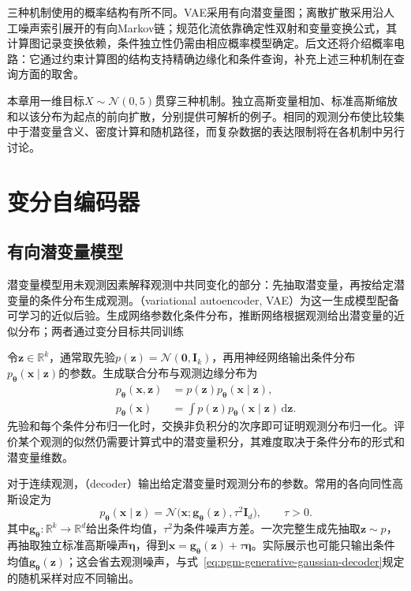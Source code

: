 三种机制使用的概率结构有所不同。VAE采用有向潜变量图；离散扩散采用沿人工噪声索引展开的有向Markov链；规范化流依靠确定性双射和变量变换公式，其计算图记录变换依赖，条件独立性仍需由相应概率模型确定。后文还将介绍概率电路：它通过约束计算图的结构支持精确边缘化和条件查询，补充上述三种机制在查询方面的取舍。

本章用一维目标$X\sim\mathcal{N}(0,5)$贯穿三种机制。独立高斯变量相加、标准高斯缩放和以该分布为起点的前向扩散，分别提供可解析的例子。相同的观测分布使比较集中于潜变量含义、密度计算和随机路径，而复杂数据的表达限制将在各机制中另行讨论。

\section{变分自编码器}
\label{sec:pgm-generative-vae}

\subsection{有向潜变量模型}
\label{sec:pgm-generative-latent-model}

潜变量模型用未观测因素解释观测中共同变化的部分：先抽取潜变量，再按给定潜变量的条件分布生成观测。（variational autoencoder, VAE）为这一生成模型配备可学习的近似后验。生成网络参数化条件分布，推断网络根据观测给出潜变量的近似分布；两者通过变分目标共同训练

令$\bm{z}\in\mathbb{R}^{k}$，通常取先验$p(\bm{z})=\mathcal{N}(\bm{0},\bm{I}_k)$，再用神经网络输出条件分布$p_{\bm{\theta}}(\bm{x}\mid\bm{z})$的参数。生成联合分布与观测边缘分布为
\begin{equation}
  \label{eq:pgm-generative-vae-joint}
  \begin{aligned}
    p_{\bm{\theta}}(\bm{x},\bm{z})
      &=p(\bm{z})p_{\bm{\theta}}(\bm{x}\mid\bm{z}),\\
    p_{\bm{\theta}}(\bm{x})
      &=\int p(\bm{z})p_{\bm{\theta}}(\bm{x}\mid\bm{z})
          \,\mathrm{d}\bm{z}.
  \end{aligned}
\end{equation}
先验和每个条件分布归一化时，交换非负积分的次序即可证明观测分布归一化。评价某个观测的似然仍需要计算式中的潜变量积分，其难度取决于条件分布的形式和潜变量维数。

对于连续观测，（decoder）输出给定潜变量时观测分布的参数。常用的各向同性高斯设定为
\begin{equation}
  \label{eq:pgm-generative-gaussian-decoder}
  p_{\bm{\theta}}(\bm{x}\mid\bm{z})
  =\mathcal{N}\bigl(\bm{x};
    \bm{g}_{\bm{\theta}}(\bm{z}),\tau^2\bm{I}_d\bigr),
  \qquad \tau>0.
\end{equation}
其中$\bm{g}_{\bm{\theta}}:\mathbb{R}^{k}\to\mathbb{R}^{d}$给出条件均值，$\tau^2$为条件噪声方差。一次完整生成先抽取$\bm{z}\sim p$，再抽取独立标准高斯噪声$\bm{\eta}$，得到$\bm{x}=\bm{g}_{\bm{\theta}}(\bm{z})+\tau\bm{\eta}$。实际展示也可能只输出条件均值$\bm{g}_{\bm{\theta}}(\bm{z})$；这会省去观测噪声，与式~\eqref{eq:pgm-generative-gaussian-decoder}规定的随机采样对应不同输出。

